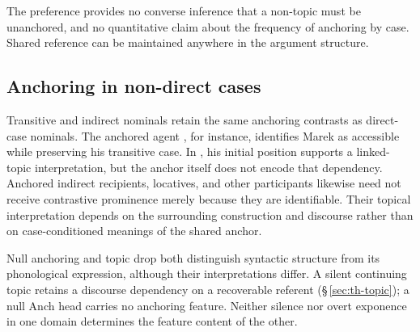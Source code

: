 \noindent The preference provides no converse inference that a non-topic must
 be unanchored, and no quantitative claim about the frequency of anchoring by
 case. Shared reference can be maintained anywhere in the argument structure.

\subsection{Anchoring in non-direct cases}
\label{sec:nm-topic-oblique}

Transitive and indirect nominals retain the same anchoring contrasts as
 direct-case nominals. The anchored agent , for instance,
 identifies Marek as accessible while preserving his transitive case. In
 , his initial position supports a linked-topic
 interpretation, but the anchor itself does not encode that dependency.
 Anchored indirect recipients, locatives, and other participants likewise
 need not receive contrastive prominence merely because they are identifiable.
 Their topical interpretation depends on the surrounding construction and
 discourse rather than on case-conditioned meanings of the shared anchor.

Null anchoring and topic drop both distinguish syntactic structure from its
phonological expression, although their interpretations differ. A silent
continuing topic retains a discourse dependency on a recoverable referent
(§\,\ref{sec:th-topic}); a null Anch head carries no anchoring
feature. Neither silence nor overt exponence in one domain determines the
feature content of the other.

\FloatBarrier
